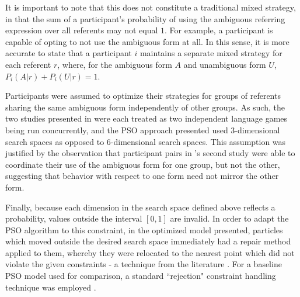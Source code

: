 \documentclass[11pt]{article}
\begin{document}
It is important to note that this does not constitute a traditional mixed strategy, in that the sum of a participant's probability of using the ambiguous referring expression over all referents may not equal $1$.  For example, a participant is capable of opting to not use the ambiguous form at all. In this sense, it is more accurate to state that a participant $i$ maintains a separate mixed strategy for each referent $r$, where, for the ambiguous form $A$ and unambiguous form $U$, $P_i(A|r) + P_i(U|r) = 1$.

Participants were assumed to optimize their strategies for groups of referents sharing the same ambiguous form independently of other groups. As such, the two studies presented in \citeauthor{rohde2012} were each treated as two independent language games being run concurrently, and the PSO approach presented used 3-dimensional search spaces as opposed to 6-dimensional search spaces. This assumption was justified by the observation that participant pairs in \citeauthor{rohde2012}'s second study were able to coordinate their use of the ambiguous form for one group, but not the other, suggesting that behavior with respect to one form need not mirror the other form.

Finally, because each dimension in the search space defined above reflects a probability, values outside the interval $[0, 1]$ are invalid. In order to adapt the PSO algorithm to this constraint, in the optimized model presented, particles which moved outside the desired search space immediately had a repair method applied to them, whereby they were relocated to the nearest point which did not violate the given constraints - a technique from the literature \citep{engelbrecht2005}. For a baseline PSO model used for comparison, a standard ``rejection" constraint handling technique was employed \citep{engelbrecht2005}.

 
\end{document}
